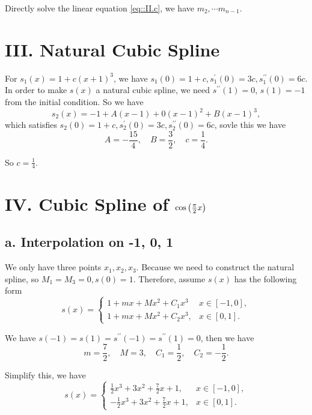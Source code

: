 \documentclass[a4paper]{article}
\begin{document}
Directly solve the linear equation \eqref{eq::II.c}, we have $ m_2, \cdots m_{n-1} $. 


\section*{III. Natural Cubic Spline}

For $s_1(x) = 1+c(x+1)^3$, we have $s_1(0) = 1+c, s_1 ^{\prime}(0) = 3c, s_1 ^{\prime \prime}(0) = 6c$. In order to make $s(x)$ a natural cubic spline, we need $s ^{\prime \prime}(1) = 0$, $s(1)=-1$ from the initial condition. So we have
\begin{equation}
    s_2(x) = -1 + A (x-1) + 0(x-1)^2 + B(x-1)^3,
\end{equation}
which satisfies $s_2(0) = 1+c, s_2^{\prime}(0) = 3c, s_2 ^{\prime \prime}(0) = 6c$, sovle this we have
\begin{equation}
        A = - \frac{15}{4}, \quad
        B = \frac{3}{2}, \quad
        c = \frac{1}{4}.
\end{equation}

So $c = \frac{1}{4}$.

\section*{IV. Cubic Spline of $\cos\qty(\frac{\pi}{2}x)$}

\subsection*{a. Interpolation on -1, 0, 1}

We only have three points $x_1,x_2,x_3$. Because we need to construct the natural spline, so $M_1 = M_3 = 0, s(0) = 1$. Therefore, assume $s(x)$ has the following form
\begin{equation}
    s(x) = 
    \begin{cases}
        1 + mx + Mx^2 + C_1 x^3 & x \in [-1,0],\\
        1 + mx + Mx^2 + C_2 x^3, & x \in [0,1].
    \end{cases}
\end{equation}

We have $s(-1) = s(1) = s^{\prime \prime}(-1) = s^{\prime \prime}(1) = 0$, then we have
\begin{equation}
    m = \frac{7}{2}, \quad M = 3, \quad C_1 = \frac{1}{2}, \quad C_2 = -\frac{1}{2}.
\end{equation}

Simplify this, we have
\begin{equation}
    s(x) = 
    \begin{cases}
        \frac{1}{2} x^3 + 3x^2 + \frac{7}{2}x + 1, & x \in [-1,0],\\
        -\frac{1}{2} x^3 + 3x^2 + \frac{7}{2}x + 1, & x \in [0,1].
    \end{cases}
    \label{eq::IV.s(x)}
\end{equation}
\end{document}

